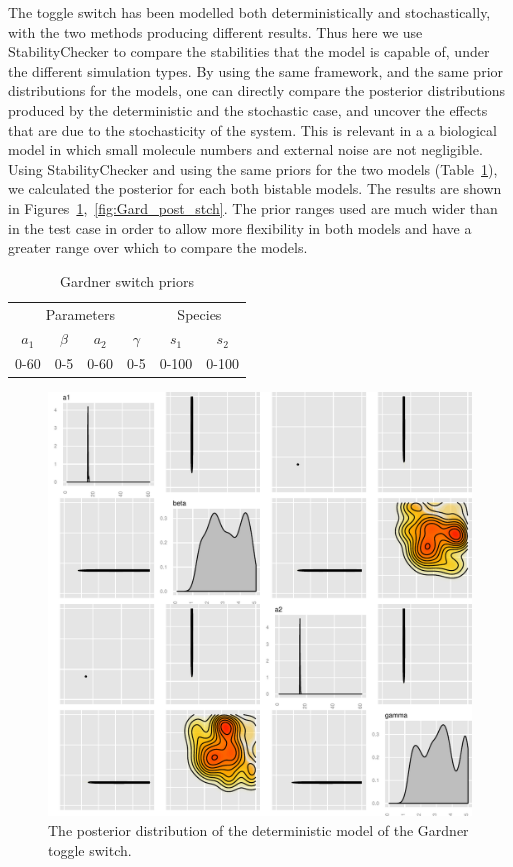 The toggle switch has been modelled both deterministically and stochastically, with the two methods producing different results. Thus here we use StabilityChecker to compare the stabilities that the model is capable of, under the different simulation types. By using the same framework, and the same prior distributions for the models, one can directly compare the posterior distributions produced by the deterministic and the stochastic case, and uncover the effects that are due to the stochasticity of the system. This is relevant in a a biological model in which small molecule numbers and external noise are not negligible. Using StabilityChecker and using the same priors for the two models (Table~\ref{tab:gard_det_stoch}), we calculated the posterior for each both bistable models. The results are shown in Figures~\ref{fig:Gard_post_det_high},~\ref{fig:Gard_post_stch}. The prior ranges used are much wider than in the test case in order to allow more flexibility in both models and have a greater range over which to compare the models. 

\clearpage
\begin{table}[p]
\centering
\caption{Gardner switch priors}
\label{tab:gard_det_stoch}
\begin{tabular}{cccc|cc}
\multicolumn{4}{c|}{Parameters} & \multicolumn{2}{c}{Species} \\ %
$a_1$   & $\beta$   & $a_2$   & $\gamma$  &   $s_1$      &       $s_2$   \\
0-60    & 0-5       & 0-60    &  0-5      &      0-100   &          0-100   
\end{tabular}
\end{table}


\begin{figure}[p]
\centering
\includegraphics[scale=0.7 ]{images/Gardner/posterior_det_high_mean.pdf}
\caption{The posterior distribution of the deterministic model of the Gardner toggle switch.}
\label{fig:Gard_post_det_high}
\end{figure}
\newpage

